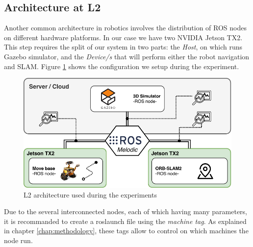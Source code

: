 \subsection{Architecture at L2}
Another common architecture in robotics involves the distribution of ROS nodes on different hardware platforms. In our case we have two NVIDIA Jetson TX2. 
This step requires the split of our system in two parts: the \textit{Host}, on which runs Gazebo simulator, and the \textit{Device/s} that will perform either the robot navigation and SLAM.
Figure \ref{fig:l2arch-exp} shows the configuration we setup during the experiment.

\begin{figure}[htbp]
	\centering
	\includegraphics[width=\textwidth]{images/L2-arch-exp}
	\caption{L2 architecture used during the experiments}
	\label{fig:l2arch-exp}
\end{figure}

Due to the several interconnected nodes, each of which having many parameters, it is recommanded to create a roslaunch file  using the \textit{machine tag}. As explained in chapter \ref{chap:methodology}, these tags allow to control on which machines the node run.

